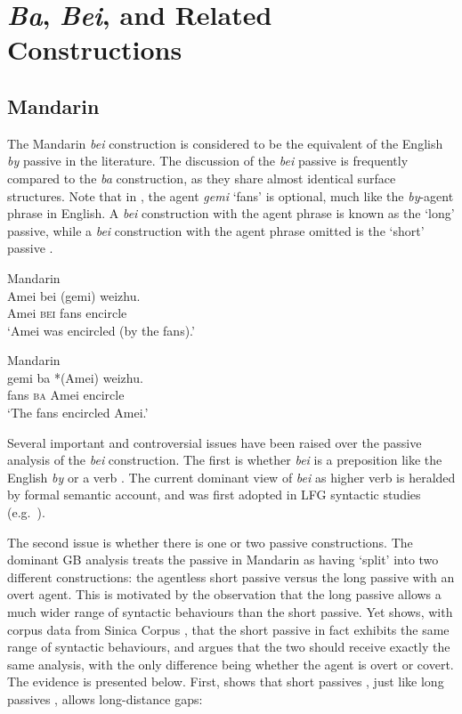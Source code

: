 \documentclass[output=paper,chinesefont,hidelinks]{langscibook}
\begin{document}
\section{\textit{Ba}, \textit{Bei}, and Related Constructions}
\label{sec:Sinitic:4.1}

\subsection{Mandarin}
\label{sec:Sinitic:4.1.1}

The Mandarin \textit{bei} construction is considered to be the equivalent of the English \textit{by} passive in the literature. The discussion of the \textit{bei} passive is frequently compared to the \textit{ba} construction, as they share almost identical surface structures. Note that in , the agent \textit{gemi} `fans' is optional, much like the \textit{by}-agent phrase in English. A \textit{bei} construction with the agent phrase is known as the `long' passive, while a \textit{bei} construction with the agent phrase omitted is the `short' passive \citep{HuangLiLi2009,HuangShi2016}.

\ea%
    \label{ex:Sinitic:23}Mandarin\\
    \gll Amei  bei  (gemi)  weizhu.\\
         Amei   \textsc{bei}    {\db}fans  encircle\\
    \glt `Amei was encircled (by the fans).'
    \z

\ea%
    \label{ex:Sinitic:24}Mandarin\\
    \gll gemi  ba  *(Amei)  weizhu.\\
         fans  \textsc{ba}   {\db\db}Amei       encircle\\
    \glt `The fans encircled Amei.'
    \z

\noindent Several important and controversial issues have been raised over the passive analysis of the \textit{bei} construction. The first is whether \textit{bei} is a preposition like the English \textit{by} \citep{huang82,Li1990,lithompson,Lu1980,McCawley1992,Tsao1996} or a verb \citep{Bender2000,Feng1995,Her1989,Her2009,Hsueh1989,Huang1999}. The current dominant view of \textit{bei} as higher verb is heralded by  formal semantic account, and was first adopted in LFG syntactic studies (e.g.\ \citealt{HuangMangione1985,Bender2000}).

  The second issue is whether there is one or two passive constructions. The dominant GB analysis treats the passive in Mandarin as having `split' into two different constructions: the agentless short passive versus the long passive with an overt agent. This is motivated by the observation that the long passive allows a much wider range of syntactic behaviours than the short passive. Yet \citet{Her2009} shows, with corpus data from Sinica Corpus \citep{ChenEtAl1996}, that the short passive in fact exhibits the same range of syntactic behaviours, and argues that the two should receive exactly the same analysis, with the only difference being whether the agent is overt or covert. The evidence is presented below. First, \citet{Her2009} shows that short passives , just like long passives , allows long-distance gaps:
\end{document}
